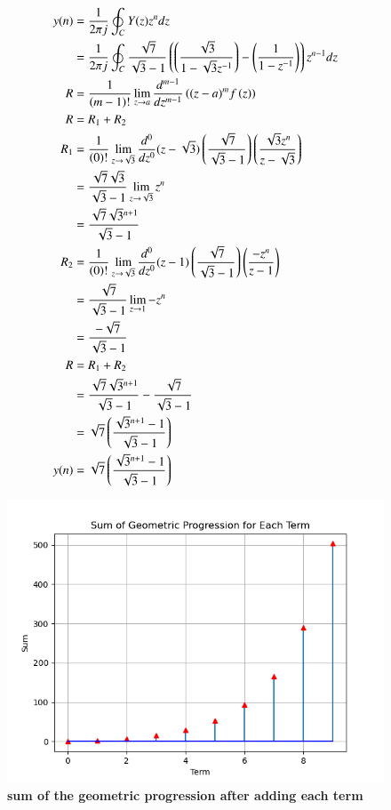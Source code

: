 \documentclass[a4,12pt,onecolumn]{IEEEtran}
\begin{document}
 \begin{align}
    y(n)&=\frac{1}{2\pi j}\oint_{C}Y(z)z^{n} dz\\
    &=\frac{1}{2\pi j}\oint_{C}\frac{\sqrt{7}}{\sqrt{3}-1}\left(\left(\frac{\sqrt{3}}{1-\sqrt{3}z^{-1}}\right)-\left(\frac{1}{1-z^{-1}}\right)\right)z^{n-1} dz\\
    R &=\frac{1}{\left(m-1\right)!}\lim\limits_{z\to a}\frac{d^{m-1}}{dz^{m-1}}\left({(z-a)}^{m}f\left(z\right)\right) \\
    R&=R_1 + R_2\\
    R_1&=\frac{1}{\left(0\right)!}\lim\limits_{z\to \sqrt{3}}\frac{d^0}{dz^0}(z-\sqrt{3})\left(\frac{\sqrt{7}}{\sqrt{3}-1}\right)\left(\frac{\sqrt{3}z^{n}}{z-\sqrt{3}}\right)\\
    &=\frac{\sqrt{7}\sqrt{3}}{\sqrt{3}-1}\lim\limits_{z\to \sqrt{3}}z^{n}\\
    &=\frac{\sqrt{7}\sqrt{3}^{n+1}}{\sqrt{3}-1}\\
    R_2&=\frac{1}{\left(0\right)!}\lim\limits_{z\to \sqrt{3}}\frac{d^0}{dz^0}(z-1)\left(\frac{\sqrt{7}}{\sqrt{3}-1}\right)\left(\frac{-z^{n}}{z-1}\right)\\
    &=\frac{\sqrt{7}}{\sqrt{3}-1}\lim\limits_{z\to 1}-z^{n}\\
    &=\frac{-\sqrt{7}}{\sqrt{3}-1}\\
    R&=R_1 + R_2\\
    &=\frac{\sqrt{7}\sqrt{3}^{n+1}}{\sqrt{3}-1}-\frac{\sqrt{7}}{\sqrt{3}-1}\\
    &=\sqrt{7}\left(\frac{\sqrt{3}^{n+1}-1}{\sqrt{3}-1}\right)\\
    y(n) &=\sqrt{7}\left(\frac{\sqrt{3}^{n+1}-1}{\sqrt{3}-1}\right)
    \end{align}
   
 
\begin{figure}[ht!]
\includegraphics[width=\columnwidth]{fig/fig1.png}
\caption{\textbf{\large{sum of the geometric progression after adding each term}}}
\end{figure}
\end{document}
